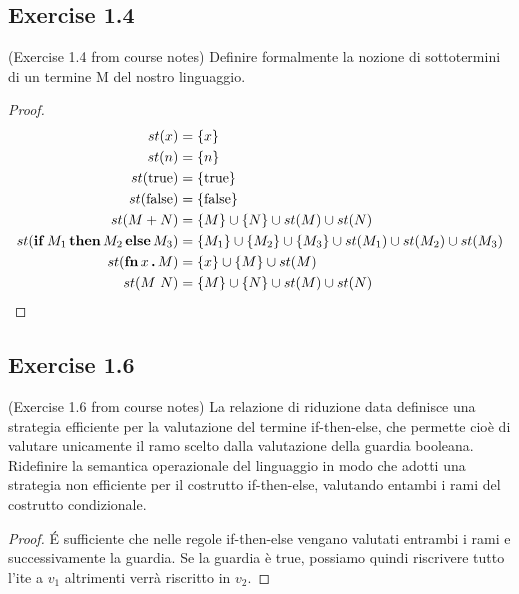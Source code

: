 \documentclass[12pt,a4paper,oneside]{book}
\begin{document}
\subsection{Exercise 1.4}

\begin{exercise}{(Exercise 1.4 from course notes)}
    Definire formalmente la nozione di sottotermini di un termine M
    del nostro linguaggio.
    \begin{proof}
        \begin{equation}
        	\begin{split}
	        	st(x) &= \{ x \}\\
	        	st(n) &= \{ n \}\\
	        	st(\mathrm{true}) &= \{ \mathrm{true} \}\\
	        	st(\mathrm{false}) &= \{ \mathrm{false} \}\\
	        	st(M + N) &= \{ M \} \cup \{ N \} \cup st(M) \cup st(N)\\
	        	st(\mathop{\textup{\textbf{if}}} M_1 \mathop{\textup{\textbf{then}}} M_2 \mathop{\textup{\textbf{else}}} M_3) &= \{ M_1 \} \cup \{ M_2 \} \cup \{ M_3 \} \cup st(M_1) \cup st(M_2) \cup st(M_3)\\
	        	st(\mathop{\textup{\textbf{fn}}} x \mathop{\textup{\textbf{.}}} M) &= \{ x \} \cup \{ M \} \cup st(M)\\
	        	st(M\ N) &= \{ M \} \cup \{ N \} \cup st(M) \cup st(N)\\
        	\end{split}
        \end{equation}
    \end{proof}
\end{exercise}

\subsection{Exercise 1.6}

\begin{exercise}{(Exercise 1.6 from course notes)}
	La relazione di riduzione data definisce una strategia efficiente per la valutazione del termine if-then-else, che permette cioè di valutare unicamente il ramo scelto dalla valutazione della guardia booleana. Ridefinire la semantica operazionale del linguaggio in modo che adotti una strategia non efficiente per il costrutto if-then-else, valutando entambi i rami del costrutto condizionale.
	
	\begin{proof}
		\'E sufficiente che nelle regole if-then-else vengano valutati entrambi i rami e successivamente la guardia. Se la guardia è true, possiamo quindi riscrivere tutto l'ite a $v_1$ altrimenti verrà riscritto in $v_2$.
	\end{proof}
\end{exercise}
\end{document}
